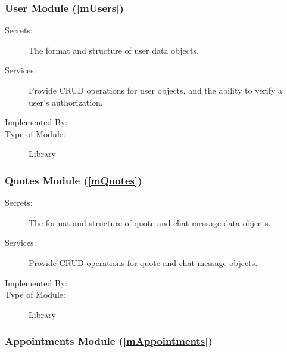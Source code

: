 \documentclass[12pt, titlepage]{article}
\begin{document}


\subsubsection{User Module (\ref{mUsers})}

\begin{description}
	\item[Secrets:] The format and structure of user data objects.
	\item[Services:] Provide CRUD operations for user objects, and the ability to verify a user's
		authorization.
	\item[Implemented By:] \progname{}
	\item[Type of Module:] Library
\end{description}

\subsubsection{Quotes Module (\ref{mQuotes})}

\begin{description}
	\item[Secrets:] The format and structure of quote and chat message data objects.
	\item[Services:] Provide CRUD operations for quote and chat message objects.
	\item[Implemented By:] \progname{}
	\item[Type of Module:] Library
\end{description}

\subsubsection{Appointments Module (\ref{mAppointments})}
\end{document}
